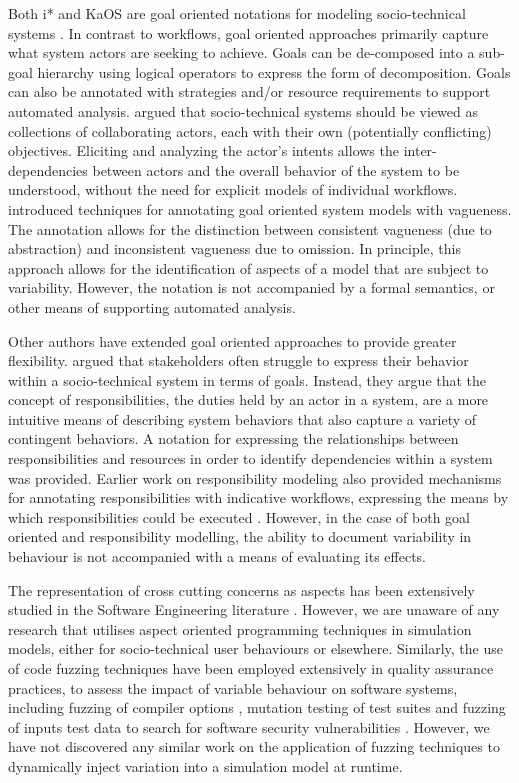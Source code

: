 \documentclass{llncs}
\begin{document}
Both i* \citep{yu1995social} and KaOS \citep{dardenne93goal} are goal oriented notations for modeling socio-technical
systems \cite{werneck2009goreistarkaos}.  In contrast to workflows, goal oriented approaches primarily capture what
system actors are seeking to achieve.  Goals can be de-composed into a sub-goal hierarchy using logical operators to
express the form of decomposition. Goals can also be annotated with strategies and/or resource requirements to support
automated analysis.  \citet{yu1995social} argued that socio-technical systems should be viewed as collections of
collaborating actors, each with their own (potentially conflicting) objectives.  Eliciting and analyzing the actor’s
intents allows the inter-dependencies between actors and the overall behavior of the system to be understood, without
the need for explicit models of individual workflows. \citet{herrmann1999vagueness} introduced techniques for annotating
goal oriented system models with vagueness.  The annotation allows for the distinction between consistent vagueness (due
to abstraction) and inconsistent vagueness due to omission.  In principle, this approach allows for the identification
of aspects of a model that are subject to variability.  However, the notation is not accompanied by a formal semantics,
or other means of supporting automated analysis.

Other authors have extended goal oriented approaches to provide greater flexibility. \citet{sommerville09deriving}
argued that stakeholders often struggle to express their behavior within a socio-technical system in terms of goals.
Instead, they argue that the concept of responsibilities, the duties held by an actor in a system, are a more intuitive
means of describing system behaviors that also capture a variety of contingent behaviors.  A notation for expressing the
relationships between responsibilities and resources in order to identify dependencies within a system was provided.
Earlier work on responsibility modeling also provided mechanisms for annotating responsibilities with indicative
workflows, expressing the means by which responsibilities could be executed \citep{dewsbury07responsibility}.  However,
in the case of both goal oriented and responsibility modelling, the ability to document variability in behaviour is not
accompanied with a means of evaluating its effects.

The representation of cross cutting concerns as aspects has been extensively studied in the Software Engineering
literature \citep{Ali2012Aspect}.  However, we are unaware of any research that utilises aspect oriented programming
techniques in simulation models, either for socio-technical user behaviours or elsewhere.  Similarly, the use of code
fuzzing techniques have been employed extensively in quality assurance practices, to assess the impact of variable
behaviour on software systems, including fuzzing of compiler options \cite{fuzzing-compiler}, mutation testing of test
suites \cite{demillo78hints} and fuzzing of inputs test data to search for software security vulnerabilities
\citep{takanen08fuzzing}.  However, we have not discovered any similar work on the application of fuzzing techniques to
dynamically inject variation into a simulation model at runtime.
\end{document}
